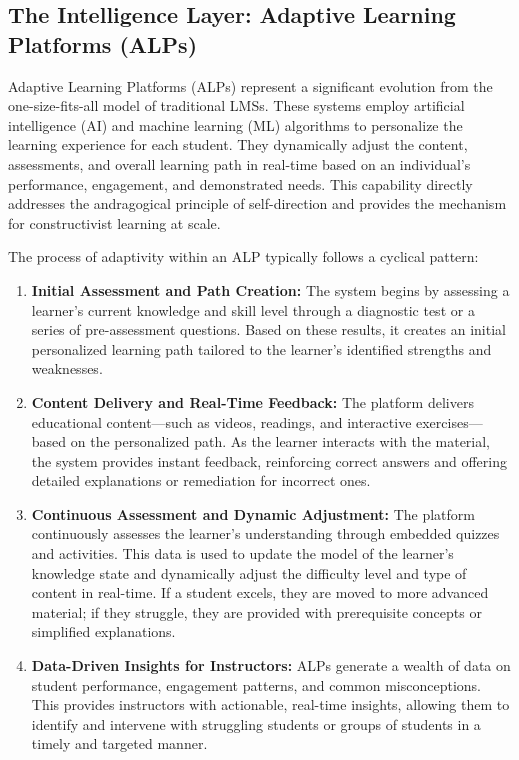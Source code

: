\documentclass{article}
\begin{document}
\subsection{The Intelligence Layer: Adaptive Learning Platforms (ALPs)}

Adaptive Learning Platforms (ALPs) represent a significant evolution from the one-size-fits-all model of traditional LMSs. These systems employ artificial intelligence (AI) and machine learning (ML) algorithms to personalize the learning experience for each student.\cite{33, 34} They dynamically adjust the content, assessments, and overall learning path in real-time based on an individual's performance, engagement, and demonstrated needs.\cite{35, 36, 37} This capability directly addresses the andragogical principle of self-direction and provides the mechanism for constructivist learning at scale.

The process of adaptivity within an ALP typically follows a cyclical pattern:
\begin{enumerate}
    \item \textbf{Initial Assessment and Path Creation:} The system begins by assessing a learner's current knowledge and skill level through a diagnostic test or a series of pre-assessment questions. Based on these results, it creates an initial personalized learning path tailored to the learner's identified strengths and weaknesses.\cite{33, 34}
    \item \textbf{Content Delivery and Real-Time Feedback:} The platform delivers educational content—such as videos, readings, and interactive exercises—based on the personalized path. As the learner interacts with the material, the system provides instant feedback, reinforcing correct answers and offering detailed explanations or remediation for incorrect ones.\cite{33, 35}
    \item \textbf{Continuous Assessment and Dynamic Adjustment:} The platform continuously assesses the learner's understanding through embedded quizzes and activities. This data is used to update the model of the learner's knowledge state and dynamically adjust the difficulty level and type of content in real-time.\cite{34, 36} If a student excels, they are moved to more advanced material; if they struggle, they are provided with prerequisite concepts or simplified explanations.\cite{33}
    \item \textbf{Data-Driven Insights for Instructors:} ALPs generate a wealth of data on student performance, engagement patterns, and common misconceptions. This provides instructors with actionable, real-time insights, allowing them to identify and intervene with struggling students or groups of students in a timely and targeted manner.\cite{34, 35, 36}
\end{enumerate}
\end{document}
